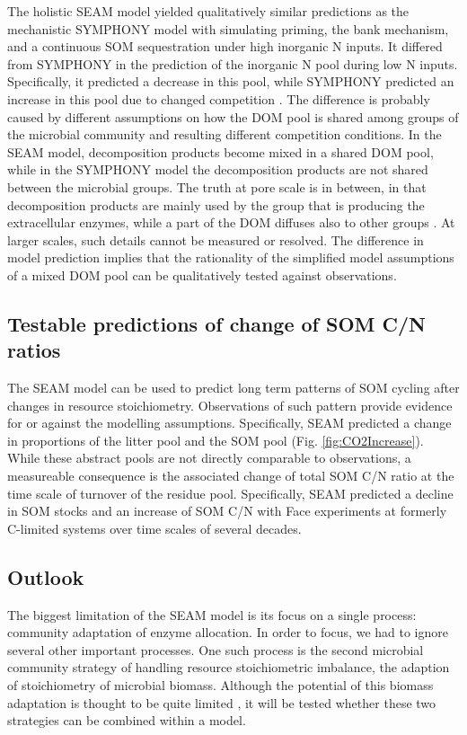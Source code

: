 The holistic SEAM model yielded qualitatively similar predictions as the
mechanistic SYMPHONY model with simulating priming, the bank mechanism, and a
continuous SOM sequestration under high inorganic N inputs. It differed from
SYMPHONY in the prediction of the inorganic N pool during low N inputs.
Specifically, it predicted a decrease in this pool, while SYMPHONY predicted an
increase in this pool due to changed competition \citep{Perveen14}. The
difference is probably caused by different assumptions on how the DOM pool is
shared among groups of the microbial community and resulting different
competition conditions. In the SEAM model, decomposition products become mixed
in a shared DOM pool, while in the SYMPHONY model the decomposition products are
not shared between the microbial groups.
The truth at pore scale is in between, in that decomposition products are mainly
used by the group that is producing the extracellular enzymes, while a part of
the DOM diffuses also to other groups \citep{Kaiser14}. At larger scales, such
details cannot be measured or resolved. The difference in model prediction
implies that the rationality of the simplified model assumptions of a mixed
DOM pool can be qualitatively tested against observations. 

\subsection{Testable predictions of change of SOM C/N ratios}
The SEAM model can be used to predict long term patterns of SOM cycling after
changes in resource stoichiometry. Observations of such pattern provide evidence
for or against the modelling assumptions.
Specifically, SEAM predicted a change in proportions of the litter pool and the
SOM pool (Fig. \ref{fig:CO2Increase}). While these abstract pools are not
directly comparable to observations, a measureable consequence is the associated
change of total SOM C/N ratio at the time scale of turnover of the residue
pool. Specifically, SEAM predicted a decline in SOM stocks and an increase of
SOM C/N with Face experiments at formerly C-limited systems over time scales of
several decades.
 
\subsection{Outlook} 
The biggest limitation of the SEAM model is its focus on a single process:
community adaptation of enzyme allocation. In order to focus, we had to ignore
several other important processes. One such process is the second microbial
community strategy of handling resource stoichiometric imbalance,
the adaption of stoichiometry of microbial biomass. Although the potential of this biomass
adaptation is thought to be quite limited \citep{Mooshammer14}, it will be
tested whether these two strategies can be combined within a model.

